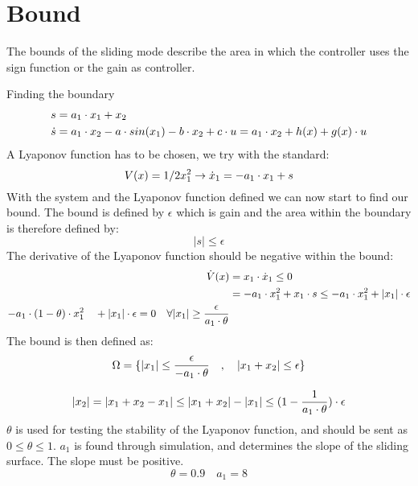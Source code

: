 \section{Bound} %
\label{sec:bound}
The bounds of the sliding mode describe the area in which the controller uses the sign function or the gain as controller.

Finding the boundary
\begin{equation}
  \begin{split}
    s &= a_1 \cdot x_1 + x_2 \\
    \dot{s} &= a_1 \cdot x_2 - a \cdot sin(x_1) - b \cdot x_2 + c \cdot u = a_1 \cdot x_2 + h(x) + g(x) \cdot u
  \end{split}
\end{equation}
A Lyaponov function has to be chosen, we try with the standard:
\begin{equation}
  V(x) = 1/2 x_1^2 \rightarrow \dot{x}_1 = -a_1 \cdot x_1 + s
\end{equation}
With the system and the Lyaponov function defined we can now start to find our bound. The bound is defined by $\epsilon$ which is gain and the area within the boundary is therefore defined by:
\begin{equation}
  \vert s \vert \leq \epsilon
\end{equation}
The derivative of the Lyaponov function should be negative within the bound:
\begin{equation}
  \begin{split}
    \dot{V}(x) &= x_1 \cdot \dot{x}_1 \leq 0 \\
    &= -a_1 \cdot x_1^2 + x_1 \cdot s \leq -a_1 \cdot x_1^2 + |x_1| \cdot \epsilon \\
    -a_1 \cdot (1-\theta) \cdot x_1^2 \quad +\vert x_1 \vert \cdot \epsilon = 0 \quad\forall |x_1| \geq \frac{\epsilon}{a_1 \cdot \theta}
  \end{split}
\end{equation}
The bound is then defined as:
\begin{equation}
  \Omega = \{ |x_1| \leq \frac{\epsilon}{-a_1 \cdot \theta} \quad , \quad |x_1 + x_2| \leq \epsilon \}
\end{equation}

\begin{equation}
  |x_2| = |x_1 + x_2 - x_1| \leq |x_1 + x_2| - |x_1| \leq (1 - \frac{1}{a_1 \cdot \theta}) \cdot \epsilon
\end{equation}
$\theta$ is used for testing the stability of the Lyaponov function, and should be sent as $0 \leq \theta \leq 1$. $a_1$ is found through simulation, and determines the slope of the sliding surface. The slope must be positive.
\begin{equation}
  \theta = 0.9 \quad a_1 = 8
\end{equation}

